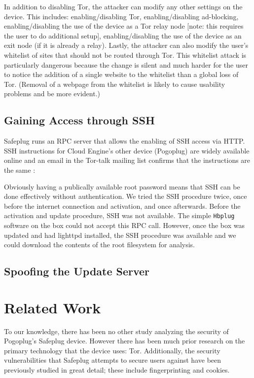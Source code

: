 \documentclass[conference]{IEEEtran}
\begin{document}
In addition to disabling Tor, the attacker can modify any other settings on the device.  This includes: enabling/disabling Tor, enabling/disabling ad-blocking, enabling/disabling the use of the device as a Tor relay node [note: this requires the user to do additional setup], enabling/disabling the use of the device as an exit node (if it is already a relay).  Lastly, the attacker can also modify the user's whitelist of sites that should not be routed through Tor.  This whitelist attack is particularly dangerous because the change is silent and much harder for the user to notice the addition of a single website to the whitelist than a global loss of Tor.  (Removal of a webpage from the whitelist is likely to cause usability problems and be more evident.)

\subsection{Gaining Access through SSH}
\label{sec:SSH}
    Safeplug runs an RPC server that allows the enabling of SSH access via HTTP. SSH instructions for Cloud Engine's other device (Pogoplug) are widely available online and an email in the Tor-talk mailing list confirms that the instructions are the same \cite{ceadmin}:

Obviously having a publically available root password means that SSH can be done effectively without authentication.  We tried the SSH procedure twice, once before the internet connection and activation, and once afterwards.  Before the activation and update procedure, SSH was not available.  The simple \verb!Hbplug! software on the box could not accept this RPC call.  However, once the box was updated and had lighttpd installed, the SSH procedure was available and we could download the contents of the root filesystem for analysis.

\subsection{Spoofing the Update Server}


\section{Related Work}
To our knowledge, there has been no other study analyzing the security of Pogoplug's Safeplug device.  However there has been much prior research on the primary technology that the device uses: Tor.  Additionally, the security vulnerabilities that Safeplug attempts to secure users against have been previously studied in great detail; these include fingerprinting and cookies.  
\end{document}
